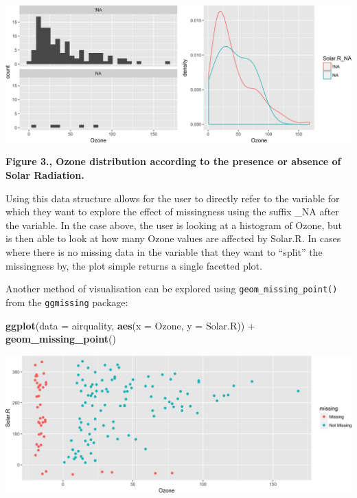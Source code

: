 \documentclass[]{article}
\newenvironment{Shaded}{\begin{snugshade}}{\end{snugshade}}
\newcommand{\KeywordTok}[1]{\textcolor[rgb]{0.13,0.29,0.53}{\textbf{{#1}}}}
\newcommand{\DataTypeTok}[1]{\textcolor[rgb]{0.13,0.29,0.53}{{#1}}}
\newcommand{\StringTok}[1]{\textcolor[rgb]{0.31,0.60,0.02}{{#1}}}
\newcommand{\NormalTok}[1]{{#1}}
\begin{document}
\includegraphics{jsm2017_njtierney_files/figure-latex/bind-shadow-density-1.png}

\textbf{Figure 3., Ozone distribution according to the presence or
absence of Solar Radiation.}

Using this data structure allows for the user to directly refer to the
variable for which they want to explore the effect of missingness using
the suffix \_NA after the variable. In the case above, the user is
looking at a histogram of Ozone, but is then able to look at how many
Ozone values are affected by Solar.R. In cases where there is no missing
data in the variable that they want to ``split'' the missingness by, the
plot simple returns a single facetted plot.

Another method of visualisation can be explored using
\texttt{geom\_missing\_point()} from the \texttt{ggmissing} package:

\begin{Shaded}
\begin{Highlighting}[]
\KeywordTok{ggplot}\NormalTok{(}\DataTypeTok{data =} \NormalTok{airquality,}
       \KeywordTok{aes}\NormalTok{(}\DataTypeTok{x =} \NormalTok{Ozone,}
           \DataTypeTok{y =} \NormalTok{Solar.R)) +}\StringTok{ }
\StringTok{  }\KeywordTok{geom_missing_point}\NormalTok{()}
\end{Highlighting}
\end{Shaded}

\includegraphics{jsm2017_njtierney_files/figure-latex/ggeom_missing-1.png}
\end{document}
